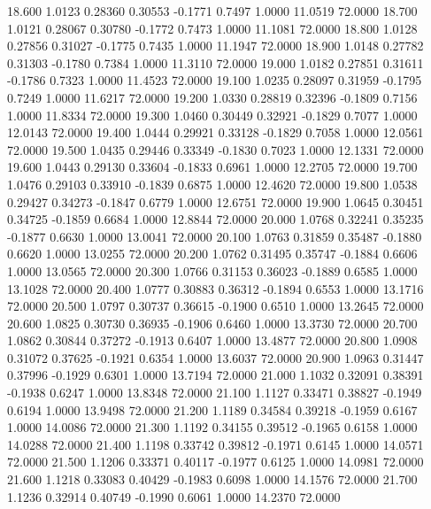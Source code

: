   18.600   1.0123   0.28360   0.30553  -0.1771   0.7497   1.0000  11.0519  72.0000
  18.700   1.0121   0.28067   0.30780  -0.1772   0.7473   1.0000  11.1081  72.0000
  18.800   1.0128   0.27856   0.31027  -0.1775   0.7435   1.0000  11.1947  72.0000
  18.900   1.0148   0.27782   0.31303  -0.1780   0.7384   1.0000  11.3110  72.0000
  19.000   1.0182   0.27851   0.31611  -0.1786   0.7323   1.0000  11.4523  72.0000
  19.100   1.0235   0.28097   0.31959  -0.1795   0.7249   1.0000  11.6217  72.0000
  19.200   1.0330   0.28819   0.32396  -0.1809   0.7156   1.0000  11.8334  72.0000
  19.300   1.0460   0.30449   0.32921  -0.1829   0.7077   1.0000  12.0143  72.0000
  19.400   1.0444   0.29921   0.33128  -0.1829   0.7058   1.0000  12.0561  72.0000
  19.500   1.0435   0.29446   0.33349  -0.1830   0.7023   1.0000  12.1331  72.0000
  19.600   1.0443   0.29130   0.33604  -0.1833   0.6961   1.0000  12.2705  72.0000
  19.700   1.0476   0.29103   0.33910  -0.1839   0.6875   1.0000  12.4620  72.0000
  19.800   1.0538   0.29427   0.34273  -0.1847   0.6779   1.0000  12.6751  72.0000
  19.900   1.0645   0.30451   0.34725  -0.1859   0.6684   1.0000  12.8844  72.0000
  20.000   1.0768   0.32241   0.35235  -0.1877   0.6630   1.0000  13.0041  72.0000
  20.100   1.0763   0.31859   0.35487  -0.1880   0.6620   1.0000  13.0255  72.0000
  20.200   1.0762   0.31495   0.35747  -0.1884   0.6606   1.0000  13.0565  72.0000
  20.300   1.0766   0.31153   0.36023  -0.1889   0.6585   1.0000  13.1028  72.0000
  20.400   1.0777   0.30883   0.36312  -0.1894   0.6553   1.0000  13.1716  72.0000
  20.500   1.0797   0.30737   0.36615  -0.1900   0.6510   1.0000  13.2645  72.0000
  20.600   1.0825   0.30730   0.36935  -0.1906   0.6460   1.0000  13.3730  72.0000
  20.700   1.0862   0.30844   0.37272  -0.1913   0.6407   1.0000  13.4877  72.0000
  20.800   1.0908   0.31072   0.37625  -0.1921   0.6354   1.0000  13.6037  72.0000
  20.900   1.0963   0.31447   0.37996  -0.1929   0.6301   1.0000  13.7194  72.0000
  21.000   1.1032   0.32091   0.38391  -0.1938   0.6247   1.0000  13.8348  72.0000
  21.100   1.1127   0.33471   0.38827  -0.1949   0.6194   1.0000  13.9498  72.0000
  21.200   1.1189   0.34584   0.39218  -0.1959   0.6167   1.0000  14.0086  72.0000
  21.300   1.1192   0.34155   0.39512  -0.1965   0.6158   1.0000  14.0288  72.0000
  21.400   1.1198   0.33742   0.39812  -0.1971   0.6145   1.0000  14.0571  72.0000
  21.500   1.1206   0.33371   0.40117  -0.1977   0.6125   1.0000  14.0981  72.0000
  21.600   1.1218   0.33083   0.40429  -0.1983   0.6098   1.0000  14.1576  72.0000
  21.700   1.1236   0.32914   0.40749  -0.1990   0.6061   1.0000  14.2370  72.0000
